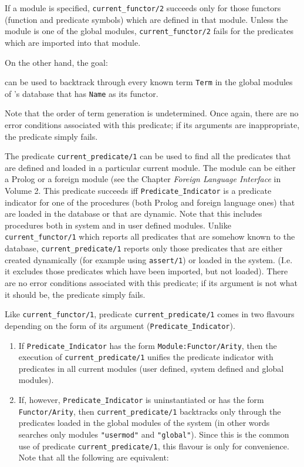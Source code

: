 \begin{description}
    If a module is specified, {\tt current\_functor/2} succeeds only for
    those functors (function and predicate symbols) which are defined in 
    that module. Unless the module is one of the global modules, 
    {\tt current\_functor/2} fails for the predicates which are imported 
    into that module.

    On the other hand, the goal:


    can be used to backtrack through every known term {\tt Term} in the global
    modules of \ourprolog's database that has {\tt Name} as its functor.

    Note that the order of term generation is undetermined. Once again, 
    there are no error conditions associated with this predicate; if its
    arguments are inappropriate, the predicate simply fails.

    The predicate {\tt current\_predicate/1} can be used to find all
    the predicates that are defined and loaded in a particular current module. 
    The module can be either a Prolog or a foreign module (see the
Chapter {\it Foreign Language Interface} in Volume 2.
    This predicate succeeds iff {\tt Predicate\_Indicator} is a 
    predicate indicator for one of the procedures (both Prolog and foreign 
    language ones) that are loaded in the database or that are dynamic. Note
    that this includes procedures both in system and in user defined modules. 
    Unlike {\tt current\_functor/1} which reports all predicates that are
    somehow known to the database, {\tt current\_predicate/1} reports only
    those predicates that are either created dynamically (for example using 
    {\tt assert/1}) or loaded in the system.  (I.e. it excludes those
    predicates which have been imported, but not loaded).
    There are no error conditions associated with this predicate; if its 
    argument is not what it should be, the predicate simply fails.

    Like {\tt current\_functor/1}, predicate {\tt current\_predicate/1}
    comes in two flavours depending on  the form of its argument 
    ({\tt Predicate\_Indicator}).
    \begin{enumerate}
    \item If {\tt Predicate\_Indicator} has the form 
	  {\tt Module:Functor/Arity}, then the execution of
	  {\tt current\_predicate/1} unifies the predicate indicator
	  with predicates in all current modules (user defined, system
	  defined and global modules). 
    \item If, however, {\tt Predicate\_Indicator} is uninstantiated 
	  or has the form {\tt Functor/Arity}, then {\tt current\_predicate/1} 
	  backtracks only through the predicates loaded in the global modules 
	  of the system (in other words searches only modules {\tt "usermod"}
	  and {\tt "global"}).
	  Since this is the common use of predicate {\tt current\_predicate/1}, 
	  this flavour is only for convenience.
	  Note that all the following are equivalent:


\end{enumerate}
\end{description}
